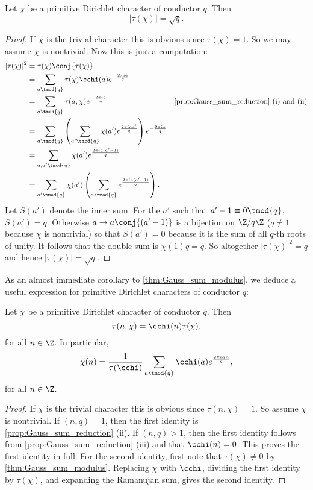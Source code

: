       \begin{theorem}\label{thm:Gauss_sum_modulus}
        Let $\chi$ be a primitive Dirichlet character of conductor $q$. Then
        \[
          |\tau(\chi)| = \sqrt{q}.
        \]
      \end{theorem}
      \begin{proof}
        If $\chi$ is the trivial character this is obvious since $\tau(\chi) = 1$. So we may assume $\chi$ is nontrivial. Now this is just a computation:
        \begin{align*}
          |\tau(\chi)|^{2} &= \tau(\chi)\conj{\tau(\chi)} \\
          &= \sum_{a \tmod{q}}\tau(\chi)\cchi(a)e^{-\frac{2\pi ia}{q}} \\
          &=  \sum_{a \tmod{q}}\tau(a,\chi)e^{-\frac{2\pi ia}{q}} & \text{\cref{prop:Gauss_sum_reduction} (i) and (ii)} \\
          &= \sum_{a \tmod{q}}\left(\sum_{a' \tmod{q}}\chi(a')e^{\frac{2\pi iaa'}{q}}\right)e^{-\frac{2\pi ia}{q}} \\
          &= \sum_{a,a' \tmod{q}}\chi(a')e^{\frac{2\pi ia(a'-1)}{q}} \\
          &= \sum_{a' \tmod{q}}\chi(a')\left(\sum_{a \tmod{q}}e^{\frac{2\pi ia(a'-1)}{q}}\right).
        \end{align*}
        Let $S(a')$ denote the inner sum. For the $a'$ such that $a'-1 \equiv 0 \tmod{q}$, $S(a') = q$. Otherwise $a \to a\conj{(a'-1)}$ is a bijection on $\Z/q\Z$ ($q \neq 1$ because $\chi$ is nontrivial) so that $S(a') = 0$ because it is the sum of all $q$-th roots of unity. It follows that the double sum is $\chi(1)q = q$. So altogether $|\tau(\chi)|^{2} = q$ and hence $|\tau(\chi)| = \sqrt{q}$.
      \end{proof}

      As an almost immediate corollary to \cref{thm:Gauss_sum_modulus}, we deduce a useful expression for primitive Dirichlet characters of conductor $q$:

      \begin{corollary}\label{cor:gauss_sum_primitive_formula}
        Let $\chi$ be a primitive Dirichlet character of conductor $q$. Then
        \[
          \tau(n,\chi) = \cchi(n)\tau(\chi),
        \]
        for all $n \in \Z$. In particular,
        \[
          \chi(n) = \frac{1}{\tau(\cchi)}\sum_{a \tmod{q}}\cchi(a)e^{\frac{2\pi ian}{q}},
        \]
        for all $n \in \Z$.
      \end{corollary}
      \begin{proof}
        If $\chi$ is the trivial character this is obvious since $\tau(n,\chi) = 1$. So assume $\chi$ is nontrivial. If $(n,q) = 1$, then the first identity is \cref{prop:Gauss_sum_reduction} (ii). If $(n,q) > 1$, then the first identity follows from \cref{prop:Gauss_sum_reduction} (iii) and that $\cchi(n) = 0$. This proves the first identity in full. For the second identity, first note that $\tau(\chi) \neq 0$ by \cref{thm:Gauss_sum_modulus}. Replacing $\chi$ with $\cchi$, dividing the first identity by $\tau(\chi)$, and expanding the Ramanujan sum, gives the second identity.
      \end{proof}

